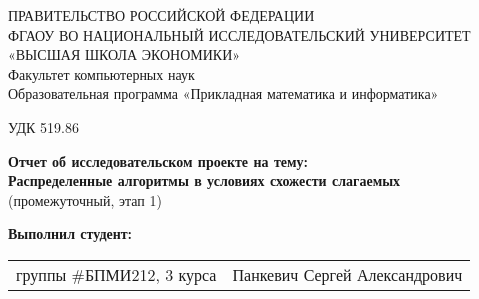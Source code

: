 \begin{titlepage}
\newpage

{
\begin{center}
ПРАВИТЕЛЬСТВО РОССИЙСКОЙ ФЕДЕРАЦИИ\\
ФГАОУ ВО НАЦИОНАЛЬНЫЙ ИССЛЕДОВАТЕЛЬСКИЙ УНИВЕРСИТЕТ\\
«ВЫСШАЯ ШКОЛА ЭКОНОМИКИ»
\\
\bigskip
Факультет компьютерных наук\\
Образовательная программа «Прикладная математика и информатика»
\end{center}
}

\vspace{2em}
УДК 519.86 %
\vspace{4em}

\begin{center}
{\bf Отчет об исследовательском проекте на тему:}\\
{\bf Распределенные алгоритмы в условиях схожести слагаемых}\\
(промежуточный, этап 1)
\end{center}

\vspace{2em}

{\bf Выполнил студент: \vspace{2mm}}

{
\begin{tabular}{l@{\hskip 1.5cm}l}
группы \#БПМИ212, 3 курса & Панкевич Сергей Александрович \\
\end{tabular}}



\end{titlepage}
